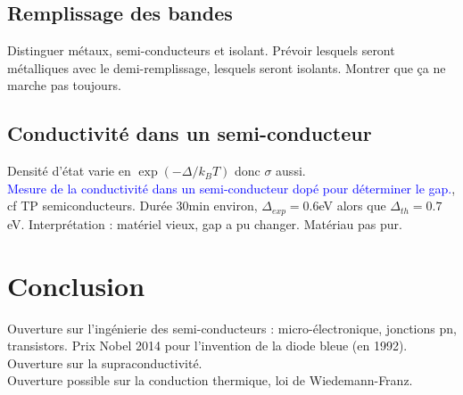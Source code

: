 \subsection{Remplissage des bandes}

Distinguer métaux, semi-conducteurs et isolant. Prévoir lesquels seront métalliques avec le demi-remplissage, lesquels seront isolants. Montrer que ça ne marche pas toujours.
\subsection{Conductivité dans un semi-conducteur}
Densité d'état varie en $\exp(-\Delta/k_BT)$ donc $\sigma$ aussi.\\

\textcolor{blue}{Mesure de la conductivité dans un semi-conducteur dopé pour déterminer le gap.}, cf TP semiconducteurs. Durée 30min environ, $\Delta_{exp}=0.6$eV alors que $\Delta_{th}=0.7$eV. Interprétation : matériel vieux, gap a pu changer. Matériau pas pur.\\
\section{Conclusion}
Ouverture sur l'ingénierie des semi-conducteurs : micro-électronique, jonctions pn, transistors. Prix Nobel 2014 pour l'invention de la diode bleue (en 1992).\\
Ouverture sur la supraconductivité.\\
Ouverture possible sur la conduction thermique, loi de Wiedemann-Franz.